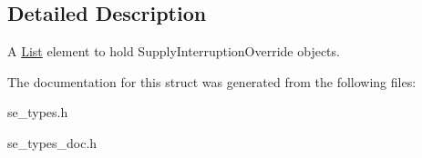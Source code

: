\subsection{Detailed Description}
A \hyperlink{structList}{List} element to hold Supply\+Interruption\+Override objects. 

The documentation for this struct was generated from the following files\+:\begin{DoxyCompactItemize}
\item 
se\+\_\+types.\+h\item 
se\+\_\+types\+\_\+doc.\+h\end{DoxyCompactItemize}
